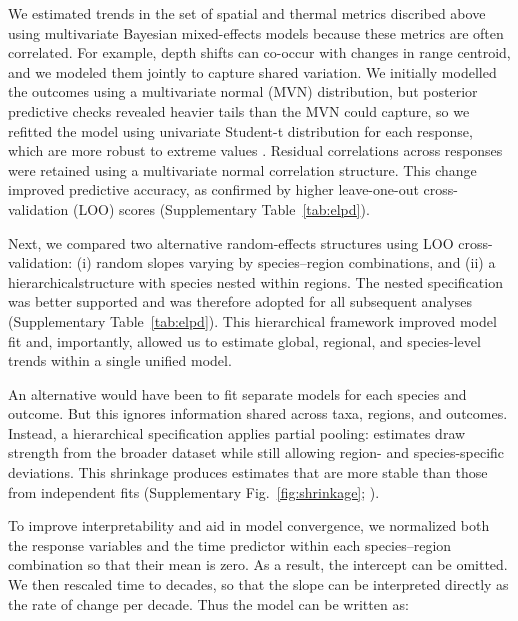 \documentclass[11pt]{article}
\begin{document}
\begin{spacing}{1.5}
We estimated trends in the set of spatial and thermal metrics discribed above using multivariate Bayesian mixed-effects models because these metrics are often correlated. For example, depth shifts can co-occur with changes in range centroid, and we modeled them jointly to capture shared variation. We initially modelled the outcomes using a multivariate normal (MVN) distribution, but posterior predictive checks revealed heavier tails than the MVN could capture, so we refitted the model using univariate Student-t distribution for each response, which are more robust to extreme values \citep[e.g.,][]{anderson_black-swan_2017}. Residual correlations across responses were retained using a multivariate normal correlation structure. This change improved predictive accuracy, as confirmed by higher leave-one-out cross-validation (LOO) scores \citep{vehtari_practical_2017} (Supplementary Table~\ref{tab:elpd}).

Next, we compared two alternative random-effects structures using LOO cross-validation: (i) random slopes varying by species–region combinations, and (ii) a hierarchicalstructure with species nested within regions. The nested specification was better supported and was therefore adopted for all subsequent analyses (Supplementary Table~\ref{tab:elpd}). This hierarchical framework improved model fit and, importantly, allowed us to estimate global, regional, and species-level trends within a single unified model.

An alternative would have been to fit separate models for each species and outcome. But this ignores information shared across taxa, regions, and outcomes. Instead, a hierarchical specification applies partial pooling: estimates draw strength from the broader dataset while still allowing region- and species-specific deviations. This shrinkage produces estimates that are more stable than those from independent fits (Supplementary Fig.~\ref{fig:shrinkage}; \citealt{mcelreath_statistical_2018}).


To improve interpretability and aid in model convergence, we normalized both the response variables and the time predictor within each species–region combination so that their mean is zero. As a result, the intercept can be omitted. We then rescaled time to decades, so that the slope can be interpreted directly as the rate of change per decade.
Thus the model can be written as:


\end{spacing}
\end{document}
